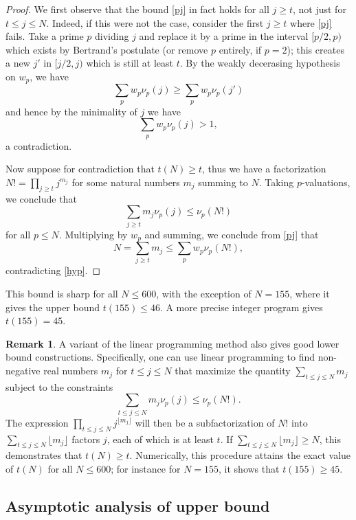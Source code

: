 \documentclass[12pt,a4paper,reqno]{amsart}
\numberwithin{equation}{section}
\theoremstyle{plain}
\theoremstyle{definition}
\newtheorem{remark}[theorem]{Remark}
\begin{document}
\begin{proof}
We first observe that the bound \eqref{pj} in fact holds for all $j \geq t$, not just for $t \leq j \leq N$.  Indeed, if this were not the case, consider the first $j \geq t$ where \eqref{pj} fails.  Take a prime $p$ dividing $j$ and replace it by a prime in the interval $[p/2,p)$ which exists by Bertrand's postulate (or remove $p$ entirely, if $p=2$); this creates a new $j'$ in $[j/2,j)$ which is still at least $t$.  By the weakly decerasing hypothesis on $w_p$, we have
$$ \sum_p w_p \nu_p(j) \geq \sum_p w_p \nu_p(j')$$
and hence by the minimality of $j$ we have
$$ \sum_p w_p \nu_p(j) > 1, $$
a contradiction.

Now suppose for contradiction that $t(N) \geq t$, thus we have a factorization $N! = \prod_{j \geq t} j^{m_j}$ for some natural numbers $m_j$ summing to $N$.  Taking $p$-valuations, we conclude that
$$ \sum_{j \geq t} m_j \nu_p(j) \leq \nu_p(N!)$$
for all $p \leq N$.  Multiplying by $w_p$ and summing, we conclude from \eqref{pj} that
$$ N = \sum_{j \geq t} m_j \leq \sum_p w_p \nu_p(N!),$$
contradicting \eqref{hyp}.
\end{proof}

This bound is sharp for all $N \leq 600$, with the exception of $N=155$, where it gives the upper bound $t(155) \leq 46$.  A more precise integer program gives $t(155) = 45$.

\begin{remark}\label{lp-rem} A variant of the linear programming method also gives good lower bound constructions. Specifically, one can use linear programming to find non-negative real numbers $m_j$ for $t \leq j \leq N$ that maximize the quantity $\sum_{t \leq j \leq N} m_j$ subject to the constraints
  $$ \sum_{t \leq j \leq N} m_j \nu_p(j) \leq \nu_p(N!).$$
The expression $\prod_{t \leq j \leq N} j^{\lfloor m_j\rfloor}$ will then be a subfactorization of $N!$ into $\sum_{t \leq j \leq N} \lfloor m_j \rfloor$ factors $j$, each of which is at least $t$. If $\sum_{t \leq j \leq N} \lfloor m_j \rfloor \geq N$, this demonstrates that $t(N) \geq t$.  Numerically, this procedure attains the exact value of $t(N)$ for all $N \leq 600$; for instance for $N=155$, it shows that $t(155) \geq 45$.
\end{remark}

\subsection{Asymptotic analysis of upper bound}
\end{document}
